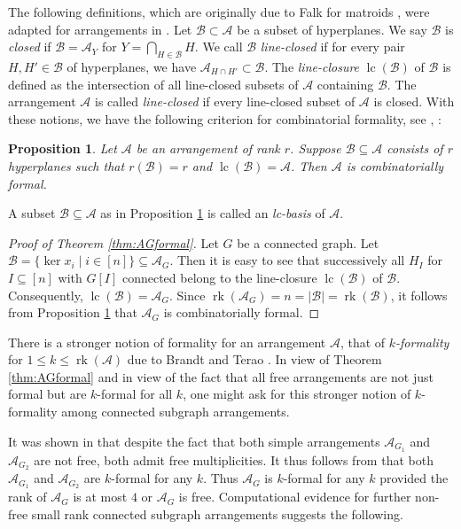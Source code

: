 \documentclass[12pt]{amsart}
\newcommand\CA{{\mathscr A}}
\newcommand\CB{{\mathscr B}}
\newcommand\rk{\operatorname{rk}}
\newcommand\lc{{\operatorname{lc}}}
\numberwithin{equation}{section}
\theoremstyle{plain}
\newtheorem{prop}[equation]{Proposition}
\theoremstyle{definition}
\begin{document}
The following definitions, which are originally due to Falk  for matroids \cite{falk:line-closure}, were adapted for arrangements in \cite[\S 2.4]{moellermueckschroehre:formal}.
Let $\CB \subset \CA$ be a subset of hyperplanes.
We say $\CB$ is \emph{closed} if $\CB =\CA_Y$ for $Y=\bigcap\limits_{H\in \CB} H$.
We call $\CB $ \emph{line-closed}
if for every pair $H,H'\in \CB $ of hyperplanes, we have $\CA_{H\cap H'}\subset \CB $.
The \emph{line-closure} $\lc(\CB)$ of $\CB $ is defined
as the intersection of all line-closed subsets of $\CA$ containing $\CB$.
The arrangement $\CA$ is called \emph{line-closed}
if every line-closed subset of $\CA$ is closed.
With these notions, we have the following criterion for combinatorial formality, see \cite[Cor.~3.8]{falk:line-closure}, \cite[Prop.~3.2]{moellermueckschroehre:formal}:

\begin{prop}
	\label{prop:lcbasis}
	Let $\CA$ be an arrangement of rank $r$. Suppose $\CB \subseteq \CA$ consists of $r$ hyperplanes such that $r(\CB)=r$ and $\lc(\CB)=\CA$. Then $\CA$ is combinatorially formal.
\end{prop}

A subset $\CB \subseteq \CA$ as in Proposition \ref{prop:lcbasis} is called an \emph{lc-basis} of $\CA$.



\begin{proof}[{Proof of Theorem \ref{thm:AGformal}}]
	Let $G$ be a connected graph.
	Let $\CB = \{\ker x_i \mid i \in [n]\} \subseteq \CA_G$.
	Then it is easy to see that successively all $H_I$ for $I \subseteq [n]$ with $G[I]$ connected belong to the line-closure $\lc(\CB)$ of $\CB$. Consequently, $\lc(\CB) = \CA_G$. Since
	$\rk(\CA_G) = n = |\CB| = \rk(\CB)$, it follows from Proposition \ref{prop:lcbasis}
	that $\CA_G$ is combinatorially formal.
\end{proof}

There is a stronger notion of formality for an arrangement $\CA$, that of \emph{$k$-formality} for $1 \le k \le \rk(\CA)$ due to Brandt and Terao \cite{brandtterao}.
In view of Theorem \ref{thm:AGformal} and in view of the fact that all free arrangements are not just formal but are $k$-formal for all $k$, one might ask for this stronger notion of $k$-formality among connected subgraph arrangements.

It was shown in \cite[Prop.~3.4]{mueckschroehrlewiesner} that despite the fact that both simple arrangements $\CA_{G_1}$ and $\CA_{G_2}$ are not free, both admit free multiplicities. It thus  follows from 
\cite[Cor.~4.10]{DiPasquale} that both $\CA_{G_1}$ and $\CA_{G_2}$ are $k$-formal for any $k$.
Thus $\CA_G$ is $k$-formal for any $k$ provided the rank of $\CA_G$ is at most $4$ or $\CA_G$ is free. Computational evidence for further non-free small rank connected subgraph arrangements suggests the following.
\end{document}
